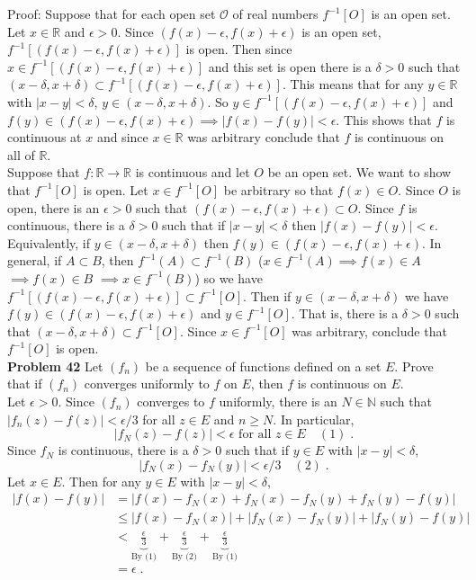 \documentclass[a4paper]{article}
\begin{document}
Proof: Suppose that for each open set $\mathcal{O}$ of real numbers $f^{-1}[O]$ is an open set. Let $x \in \mathbb{R}$ and $\epsilon > 0$. Since $(f(x) - \epsilon, f(x) + \epsilon)$ is an open set, $f^{-1}\left[(f(x) - \epsilon, f(x) + \epsilon)\right]$ is open. Then since $x \in f^{-1}\left[(f(x) - \epsilon, f(x) + \epsilon)\right]$ and this set is open there is a $\delta>0$ such that $(x - \delta, x+\delta) \subset f^{-1}\left[(f(x) - \epsilon, f(x) + \epsilon)\right]$. This means that for any $y \in \mathbb{R}$ with $|x-y| < \delta$, $y \in (x-\delta, x+\delta)$. So $y \in f^{-1}\left[(f(x) - \epsilon, f(x) + \epsilon)\right]$ and $f(y)\in (f(x) - \epsilon, f(x) + \epsilon) \implies |f(x) - f(y)| < \epsilon$. This shows that $f$ is continuous at $x$ and since $x \in \mathbb{R}$ was arbitrary conclude that $f$ is continuous on all of $\mathbb{R}$.\\

Suppose that $f: \mathbb{R} \rightarrow \mathbb{R}$ is continuous and let $O$ be an open set. We want to show that $f^{-1}[O]$ is open. Let $x \in f^{-1}[O]$ be arbitrary so that $f(x) \in O$. Since $O$ is open, there is an $\epsilon>0$ such that $(f(x) - \epsilon, f(x) + \epsilon) \subset O$. Since $f$ is continuous, there is a $\delta > 0$ such that if $|x-y|<\delta$ then $|f(x) - f(y)| < \epsilon$. Equivalently, if $y \in (x-\delta, x+\delta)$ then $f(y) \in (f(x) - \epsilon, f(x) + \epsilon)$. In general, if $A \subset B$, then $f^{-1}(A) \subset f^{-1}(B)$ ($x \in f^{-1}(A) \implies f(x) \in A$ $\implies f(x) \in B$ $\implies x \in f^{-1}(B)$) so we have $f^{-1}\left[(f(x) - \epsilon, f(x) + \epsilon)\right] \subset f^{-1}[O]$. Then if $y \in (x-\delta, x+\delta)$ we have $f(y) \in (f(x) - \epsilon, f(x) + \epsilon)$ and $y \in f^{-1}[O]$. That is, there is a $\delta>0$ such that $(x-\delta,x+\delta) \subset f^{-1}[O]$. Since $x \in f^{-1}[O]$ was arbitrary, conclude that $f^{-1}[O]$ is open. \\

{\bf Problem 42}
Let $(f_n)$ be a sequence of functions defined on a set $E$. Prove that if $(f_n)$ converges uniformly to $f$ on $E$, then $f$ is continuous on $E$. \\

Let $\epsilon>0$. Since $(f_n)$ converges to $f$ uniformly, there is an $N \in \mathbb{N}$ such that $|f_n(z) - f(z)| < \epsilon / 3$ for all $z \in E$ and $n\geq N$. In particular, $$|f_N(z) - f(z)| < \epsilon \text{ for all } z \in E \quad (1) \;.$$ Since $f_N$ is continuous, there is a $\delta > 0$ such that if $y \in E$ with $|x-y| < \delta$,
$$|f_N(x)-f_N(y)| < \epsilon / 3 \quad (2) \;.$$
Let $x \in E$. Then for any $y \in E$ with $|x-y|<\delta$,
\begin{align*}
|f(x) - f(y)| &= |f(x) -f_N(x) + f_N(x) -f_N(y) + f_N(y) - f(y)| \\
&\leq |f(x) -f_N(x)| + |f_N(x) -f_N(y)| + |f_N(y) - f(y)| \\
&< \underbrace{\frac{\epsilon}{3}}_{\text{By (1)}} + \underbrace{\frac{\epsilon}{3}}_{\text{By (2)}} +\underbrace{\frac{\epsilon}{3}}_{\text{By (1)}}\\
&= \epsilon \;.
\end{align*}
\end{document}
